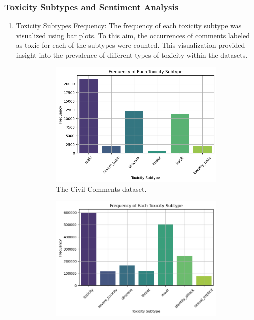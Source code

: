 \documentclass[10pt,a4paper,oneside]{article} %
\begin{document}
\subsubsection{Toxicity Subtypes and Sentiment Analysis}
\begin{enumerate}
    \item Toxicity Subtypes Frequency: The frequency of each toxicity subtype was visualized using bar plots. To this aim, the occurrences of comments labeled as toxic for each of the subtypes were counted. This visualization provided insight into the prevalence of different types of toxicity within the datasets.
    \begin{figure}[h]
    \centering
    \begin{subfigure}{0.49\textwidth}
        \centering
        \includegraphics[width=\textwidth]{replibert/replibert/plots/Toxicity_frequency_Jigsaw.png}
        \caption{The Civil Comments dataset.}
        \label{fig:tox_freq_jigsaw}
    \end{subfigure}
    \hfill
    \begin{subfigure}{0.49\textwidth}
        \centering
        \includegraphics[width=\textwidth]{replibert/replibert/plots/Toxicity_frequency_cc.png}

\end{subfigure}
\end{figure}
\end{enumerate}
\end{document}

